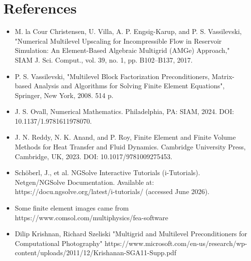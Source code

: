 \documentclass[aspectratio=169,11pt]{beamer}
\begin{document}
\section{References}
\begin{frame}
  \begin{itemize}
    \item M. la Cour Christensen, U. Villa, A. P. Engsig-Karup, and P. S. Vassilevski, "Numerical Multilevel Upscaling for Incompressible Flow in Reservoir Simulation: An Element-Based Algebraic Multigrid (AMGe) Approach," SIAM J. Sci. Comput., vol. 39, no. 1, pp. B102–B137, 2017.
    \item P. S. Vassilevski, "Multilevel Block Factorization Preconditioners, Matrix-based Analysis and Algorithms for Solving Finite Element Equations", Springer, New York, 2008. 514 p.
    \item J. S. Ovall, Numerical Mathematics. Philadelphia, PA: SIAM, 2024. DOI: 10.1137/1.9781611978070.
    \item J. N. Reddy, N. K. Anand, and P. Roy, Finite Element and Finite Volume Methods for Heat Transfer and Fluid Dynamics. Cambridge University Press, Cambridge, UK, 2023. DOI: 10.1017/9781009275453.
    \item Schöberl, J., et al. NGSolve Interactive Tutorials (i-Tutorials). Netgen/NGSolve Documentation. Available at: https://docu.ngsolve.org/latest/i-tutorials/ (accessed June 2026).
    \item Some finite element images came from https://www.comsol.com/multiphysics/fea-software
    \item Dilip Krishnan, Richard Szeliski
"Multigrid and Multilevel Preconditioners for Computational
Photography" https://www.microsoft.com/en-us/research/wp-content/uploads/2011/12/Krishanan-SGA11-Supp.pdf  
\end{itemize}
\end{frame}
\end{document}
